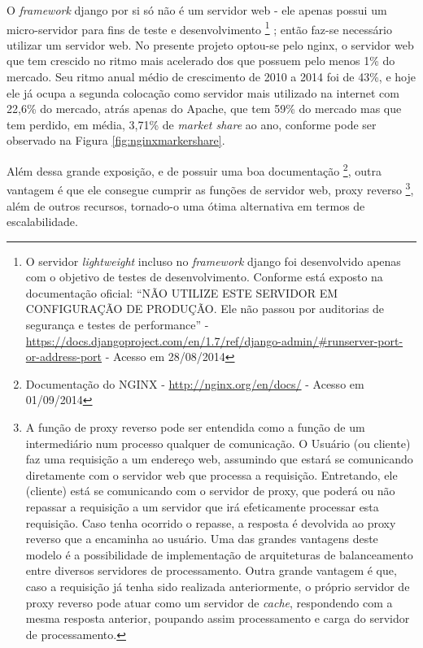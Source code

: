 O \textit{framework} \gls{django} por si só não é um servidor web - ele apenas possui um micro-servidor para fins de teste e desenvolvimento%
\footnote{O servidor \textit{lightweight} incluso no \textit{framework} \gls{django} foi desenvolvido apenas com o objetivo de testes de desenvolvimento. Conforme está exposto na documentação oficial: ``NÃO UTILIZE ESTE SERVIDOR EM CONFIGURAÇÃO DE PRODUÇÃO. Ele não passou por auditorias de segurança e testes de performance'' - {\url{https://docs.djangoproject.com/en/1.7/ref/django-admin/\#runserver-port-or-address-port}} - Acesso em 28/08/2014}%
; então faz-se necessário utilizar um servidor web. No presente projeto optou-se pelo \gls{nginx}, o servidor web que tem crescido no ritmo mais acelerado dos que possuem pelo menos 1\% do mercado. Seu ritmo anual médio de crescimento de 2010 a 2014 foi de 43\%, e hoje ele já ocupa a segunda colocação como servidor mais utilizado na internet com 22,6\% do mercado, atrás apenas do Apache, que tem 59\% do mercado mas que tem perdido, em média, 3,71\% de \textit{market share} ao ano, conforme pode ser observado na Figura \ref{fig:nginxmarkershare}.

\clearpage
Além dessa grande exposição, e de possuir uma boa documentação%
\footnote{Documentação do NGINX - \url{http://nginx.org/en/docs/} - Acesso em 01/09/2014}, outra vantagem é que ele consegue cumprir as funções de servidor web, proxy reverso%
\footnote{A função de proxy reverso pode ser entendida como a função de um intermediário num processo qualquer de comunicação. O Usuário (ou cliente) faz uma requisição a um endereço web, assumindo que estará se comunicando diretamente com o servidor web que processa a requisição. Entretando, ele (cliente) está se comunicando com o servidor de proxy, que poderá ou não repassar a requisição a um servidor que irá efeticamente processar esta requisição. Caso tenha ocorrido o repasse, a resposta é devolvida ao proxy reverso que a encaminha ao usuário. Uma das grandes vantagens deste modelo é a possibilidade de implementação de arquiteturas de balanceamento entre diversos servidores de processamento. Outra grande vantagem é que, caso a requisição já tenha sido realizada anteriormente, o próprio servidor de proxy reverso pode atuar como um servidor de \textit{cache}, respondendo com a mesma resposta anterior, poupando assim processamento e carga do servidor de processamento.},
além de outros recursos, tornado-o uma ótima alternativa em termos de escalabilidade.

